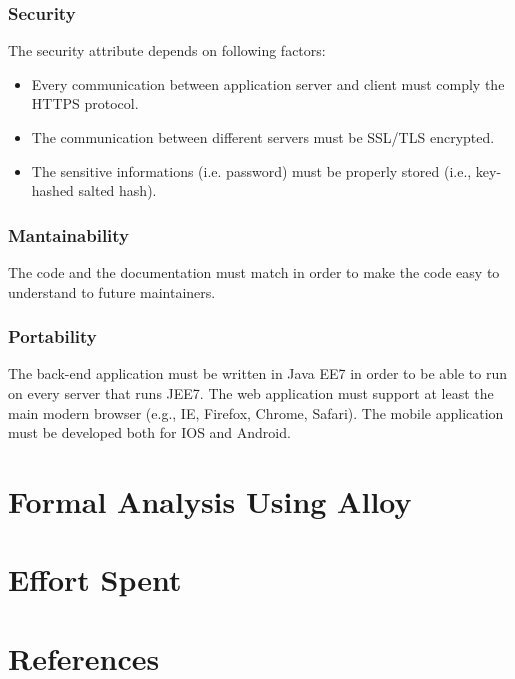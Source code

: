 \documentclass{article}
\begin{document}
	
	\subsubsection{Security}
	The security attribute depends on following factors:
	\begin{itemize}
		\item Every communication between application server and client must comply the  HTTPS protocol.
		\item The communication between different servers must be SSL/TLS encrypted.
		\item The sensitive informations (i.e. password) must be properly stored (i.e., key-hashed salted hash).
	\end{itemize}
	
	
	\subsubsection{Mantainability}
	The code and the documentation must match in order to make the code easy to understand to future maintainers.
	
	
	\subsubsection{Portability}
	The back-end application must be written in Java EE7 in order to be able to run on every server that runs JEE7. The web application must support at least the main modern browser (e.g., IE, Firefox, Chrome, Safari). The mobile application must be developed both for IOS and Android.
	
	
	\section{Formal Analysis Using Alloy}
			
	
	\section{Effort Spent}
	
	
	
	\section{References}
	
	
\end{document}
